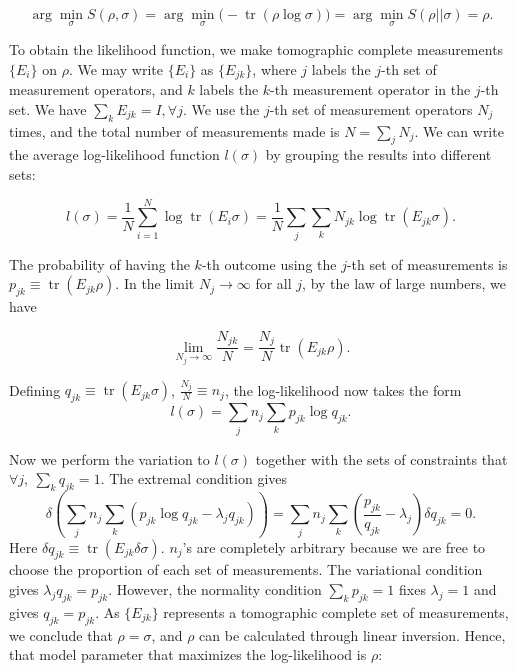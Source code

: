 \documentclass[11pt]{article}
\theoremstyle{definition}
\DeclareMathOperator{\tr}{\text{tr}}
\begin{document}
\begin{equation}\label{minrho}
   \arg \min_{\sigma} S(\rho, \sigma) =  \arg \min_{\sigma} \big(-\tr (\rho \log \sigma) \big)
= \arg \min_{\sigma} S(\rho || \sigma) = \rho.
\end{equation}

To obtain the likelihood function, we make tomographic complete measurements $\{E_i\}$ on $\rho$. 
We may write $\{E_i\}$ as $\{E_{j k}\}$, where $j$ labels the $j$-th set of measurement operators, and $k$ labels the $k$-th measurement operator in the $j$-th set.  We have $\sum_k E_{j k} = I, \forall j$. We use the $j$-th set of measurement operators $N_j$ times, and the total number of measurements made is $N = \sum_j N_j$. We can write the average log-likelihood function $l(\sigma)$ by grouping the results into different sets:

\begin{equation}
    l(\sigma)=\frac1N\sum_{i=1}^N\log\tr(E_i\sigma)=\frac1N\sum_{j}\sum_{k}N_{j k}\log\tr(E_{j k}\sigma).
\end{equation}

The probability of having the $k$-th outcome using the $j$-th set of measurements is $p_{j k}\equiv \tr (E_{j k} \rho)$. In the limit $N_j \to\infty$ for all $j$, by the law of large numbers, we have

\begin{equation}
    \lim_{N_j\to\infty}\frac{N_{j k}}{N}=\frac{N_{j}}{N}\tr(E_{j k}\rho).
\end{equation}


Defining $q_{j k}\equiv \tr(E_{j k}\sigma)$, 
$\frac{N_j}{N}\equiv n_j$, the log-likelihood now takes the form
\begin{equation}
    l(\sigma)=\sum_{j}n_j\sum_{k}p_{j k}\log q_{j k}.
\end{equation}

Now we perform the variation to $l(\sigma)$ together with the sets of constraints that $\forall j,~\sum_{k}q_{j k}=1$. The extremal condition gives
\begin{equation}
    \delta\left(\sum_{j}n_j\sum_{k}(p_{j k}\log q_{j k}-\lambda_j q_{j k})\right)=\sum_{j}n_j\sum_{k}\left(\frac{p_{j k}}{q_{j k}}-\lambda_j\right)\delta q_{j k}=0. 
\end{equation}
Here $\delta q_{j k}\equiv\tr(E_{j k}\delta\sigma)$. $n_j$'s are completely arbitrary because we are free to choose the proportion of each set of measurements. The variational condition gives $\lambda_j q_{j k}=p_{j k}$. However, the normality condition $\sum_k p_{j k}=1$ fixes $\lambda_j=1$ and gives $q_{j k}=p_{j k}$. As $\{E_{j k}\}$ represents a tomographic complete set of measurements, we conclude that $\rho = \sigma$, and $\rho$ can be calculated through linear inversion. Hence, that model parameter that maximizes the log-likelihood is $\rho$:
\end{document}
